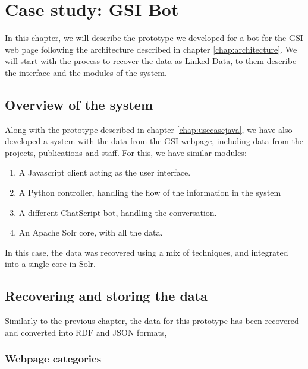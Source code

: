 \chapter{Case study: GSI Bot}
\label{chap:usecasegsi}

\begin{chapterintro}

In this chapter, we will describe the prototype we developed for a bot for the GSI web page following the architecture described in chapter \ref{chap:architecture}. We will start with the process to recover the data as Linked Data, to them describe the interface and the modules of the system.
 
\end{chapterintro}

\cleardoublepage

\section{Overview of the system}

Along with the prototype described in chapter \ref{chap:usecasejava}, we have also developed a system with the data from the GSI webpage, including data from the projects, publications and staff. For this, we have similar modules:

\begin{enumerate}
 \item A Javascript client acting as the user interface.
 \item A Python controller, handling the flow of the information in the system
 \item A different ChatScript bot, handling the conversation.
 \item An Apache Solr core, with all the data.
\end{enumerate}

In this case, the data was recovered using a mix of techniques, and integrated into a single core in Solr.

\section{Recovering and storing the data}

Similarly to the previous chapter, the data for this prototype has been recovered and converted into RDF and JSON formats, 

\subsection{Webpage categories}

